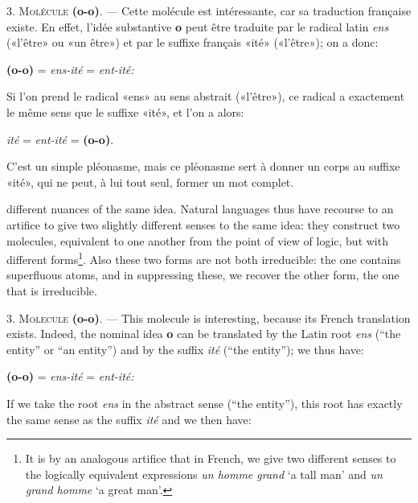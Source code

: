 \begin{sloppypar}
{     3. \textsc{Molécule} \textbf{(o-o)}. — Cette molécule est
     intéressante, car sa traduction française existe. En effet,
     l’idée substantive \textbf{o} peut être traduite par le radical
     latin \emph{ens} («l’être» ou «un être») et par le suffixe
     français «ité» («l’être»); on a donc:

     \begin{center}
       \textbf{(o-o)} = \emph{ens-ité} = \emph{ent-ité:}
     \end{center}
   
     Si l'on prend le radical «ens» au sens abstrait («l’être»), ce
     radical a exactement le même sens que le suffixe «ité», et l’on a
     alors:

     \begin{center}
       \emph{ité} = \emph{ent-ité} =\textbf{ (o-o)}.
     \end{center}

     C’est un simple pléonasme, mais ce pléonasme sert à donner un
     corps au suffixe «ité», qui ne peut, à lui tout seul, former un
     mot complet.

   }
   {\noindent
     different nuances of the same idea. Natural languages thus have
     recourse to an artifice to give two slightly different senses to
     the same idea: they construct two molecules, equivalent to one
     another from the point of view of logic, but with different
     forms\footnote{It is by an analogous artifice that in French, we
       give two different senses to the logically equivalent
       expressions \emph{un homme grand} `a tall man' and \emph{un
         grand homme} `a great man'.}. Also these two forms are not
     both irreducible: the one contains superfluous atoms, and in
     suppressing these, we recover the other form, the one that is
     irreducible.

     3. \textsc{Molecule} \textbf{(o-o)}. — This molecule is
     interesting, because its French translation exists. Indeed, the
     nominal idea \textbf{o} can be translated by the Latin root
     \emph{ens} (``the entity'' or ``an entity'') and by the suffix
     \emph{ité} (``the entity''); we thus have:

     \begin{center}
       \textbf{(o-o)} = \emph{ens-ité} = \emph{ent-ité:}
     \end{center}
   
     If we take the root \emph{ens} in the abstract sense (``the
     entity''), this root has exactly the same sense as the suffix
     \emph{ité} and we then have:

}
\end{sloppypar}
